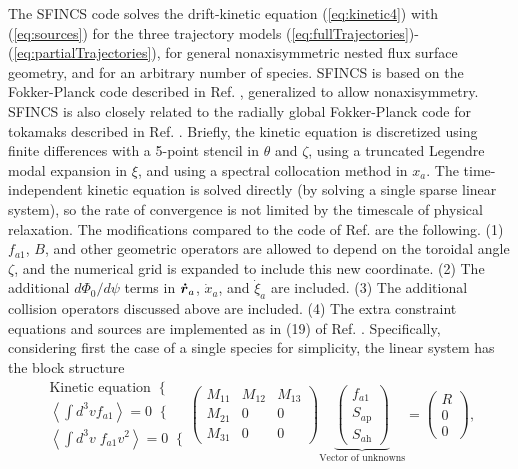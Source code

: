 \documentclass[12pt,superscriptaddress]{revtex4}
\newcommand{\vect}[1]{\mbox{\boldmath $#1$}}
\newcommand{\Sap}{S_{a\mathrm{p}}}
\newcommand{\Sah}{S_{a\mathrm{h}}}
\begin{document}
The SFINCS code solves the drift-kinetic equation (\ref{eq:kinetic4})
with (\ref{eq:sources})
for the three trajectory models (\ref{eq:fullTrajectories})-(\ref{eq:partialTrajectories}),
for general nonaxisymmetric nested flux surface geometry, and for an arbitrary number of species.
SFINCS is based on the Fokker-Planck code described in Ref. \cite{speedGrids},
generalized to allow nonaxisymmetry.
SFINCS is also closely related to the radially global Fokker-Planck code for tokamaks described
in Ref. \cite{PERFECT}.
Briefly, the kinetic equation is discretized using finite differences with a 5-point stencil in $\theta$
and $\zeta$, using a truncated Legendre modal expansion in $\xi$, and using
a spectral collocation method in $x_a$.
The time-independent kinetic equation is solved directly (by solving a single sparse linear system),
so the rate of convergence is not limited by the timescale of physical relaxation.
The modifications compared to the code of Ref. \cite{speedGrids} are the following.
(1) $f_{a1}$, $B$, and other geometric operators are allowed to depend on the toroidal angle $\zeta$,
and the numerical grid is expanded to include this new coordinate.
(2) The additional $d\Phi_0/d\psi$ terms in $\vect{\dot{r}}_a$, $\dot{x}_a$, and $\dot{\xi}_a$
are included.
(3) The additional collision operators discussed above are included.
(4) The extra constraint equations and sources are implemented as in (19) of Ref. \cite{PERFECT}.
Specifically, considering first the case of a single species for simplicity, the linear system has the block structure
\begin{equation}
\begin{array}{r}
\mbox{Kinetic equation}\;\;\{ \\
\left<\int d^3v f_{a1}\right>=0 \;\;\{ \\
\left<\int d^3v\; f_{a1} v^2\right>=0\;\; \{
\end{array}
\left(\begin{array}{ccc}
M_{11} & M_{12} & M_{13} \\
M_{21} & 0 & 0 \\
M_{31} & 0 & 0 \end{array}
\right)
\underbrace{
\left(
\begin{array}{c}
f_{a1} \\
\Sap \\
\Sah \end{array}
\right)}_{\mbox{Vector of unknowns}}
 = \left(
\begin{array}{c}
R
 \\
0 \\
0 \end{array}
\right),
\label{eq:blocks}
\end{equation}
\end{document}
